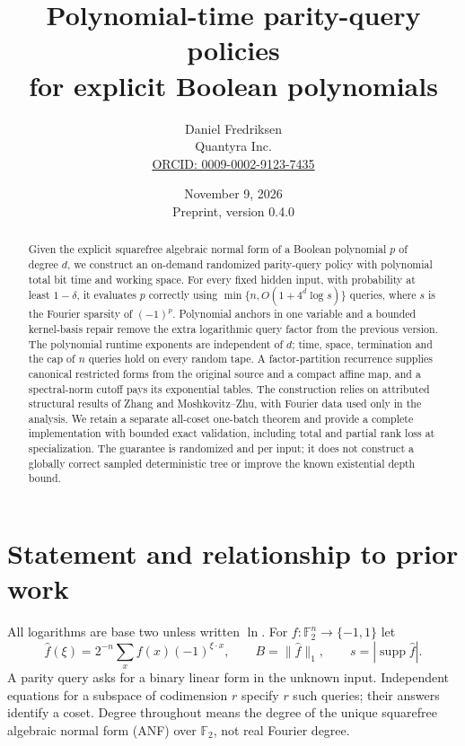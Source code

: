 \documentclass[11pt]{article}
\title{Polynomial-time parity-query policies\\for explicit Boolean polynomials}
\author{Daniel Fredriksen\\\small Quantyra Inc.\\\small\href{https://orcid.org/0009-0002-9123-7435}{ORCID: 0009-0002-9123-7435}}
\date{November 9, 2026\\\small Preprint, version 0.4.0}
\theoremstyle{remark}\newtheorem{remark}[theorem]{Remark}
\newcommand{\F}{\mathbb F}
\newcommand{\supp}{\operatorname{supp}}
\begin{document}
\maketitle
\begin{abstract}
Given the explicit squarefree algebraic normal form of a Boolean polynomial $p$ of degree $d$, we construct an on-demand randomized parity-query policy with polynomial total bit time and working space. For every fixed hidden input, with probability at least $1-\delta$, it evaluates $p$ correctly using $\min\{n,O(1+4^d\log s)\}$ queries, where $s$ is the Fourier sparsity of $(-1)^p$. Polynomial anchors in one variable and a bounded kernel-basis repair remove the extra logarithmic query factor from the previous version. The polynomial runtime exponents are independent of $d$; time, space, termination and the cap of $n$ queries hold on every random tape. A factor-partition recurrence supplies canonical restricted forms from the original source and a compact affine map, and a spectral-norm cutoff pays its exponential tables. The construction relies on attributed structural results of Zhang and Moshkovitz--Zhu, with Fourier data used only in the analysis. We retain a separate all-coset one-batch theorem and provide a complete implementation with bounded exact validation, including total and partial rank loss at specialization. The guarantee is randomized and per input; it does not construct a globally correct sampled deterministic tree or improve the known existential depth bound.
\end{abstract}

\section{Statement and relationship to prior work}
All logarithms are base two unless written $\ln$. For $f:\F_2^n\to\{-1,1\}$ let
\[
 \widehat f(\xi)=2^{-n}\sum_x f(x)(-1)^{\xi\cdot x},\qquad
 B=\|\widehat f\|_1,\qquad s=|\supp\widehat f|.
\]
A parity query asks for a binary linear form in the unknown input. Independent equations for a subspace of codimension $r$ specify $r$ such queries; their answers identify a coset.
Degree throughout means the degree of the unique squarefree algebraic normal form (ANF) over $\F_2$, not real Fourier degree.
\end{document}
